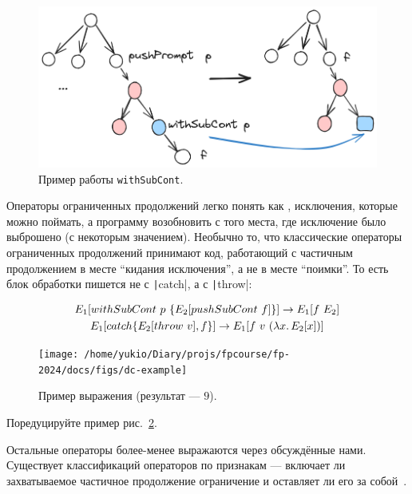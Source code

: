 \begin{figure}[h]
    \centering
    \includegraphics[width=0.7\linewidth]{figs/push-prompt}
    \caption{Пример работы \texttt{withSubCont}.}
    \label{fig:push-prompt}
\end{figure}

Операторы ограниченных продолжений легко понять как , исключения, которые можно поймать, а программу возобновить с того места, где исключение было выброшено (с некоторым значением).
Необычно то, что классические операторы ограниченных продолжений принимают код, работающий с частичным продолжением в месте ``кидания исключения'', а не в месте ``поимки''.
То есть блок обработки пишется не с \texttt|catch|, а с \texttt|throw|:

\begin{gather*}
    E_1[withSubCont ~ p ~ \{E_2[pushSubCont ~ f]\}] \to E_1[f ~ E_2]
    \\
    E_1[catch\{E_2[throw ~ v], f\}] \to E_1[f ~ v ~ (\lambda x\ldotp E_2[x])]
\end{gather*}

\begin{figure}[h]
    \centering
    \texttt{[image: /home/yukio/Diary/projs/fpcourse/fp-2024/docs/figs/dc-example]}
    \caption{Пример выражения (результат --- $9$).}
    \label{fig:dc-example}
\end{figure}

\begin{task}
    Поредуцируйте пример рис.~\ref{fig:dc-example}.
\end{task}

Остальные операторы более-менее выражаются через обсуждённые нами.
Существует классификаций операторов по признакам --- включает ли захватываемое частичное продолжение ограничение и оставляет ли его за собой~\cite{dyvbig2007monadic}.


